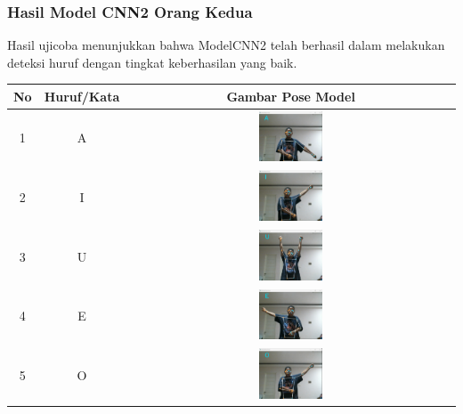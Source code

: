\subsubsection*{Hasil Model CNN2 Orang Kedua}

Hasil ujicoba menunjukkan bahwa ModelCNN2 telah berhasil dalam melakukan deteksi huruf dengan tingkat keberhasilan yang baik.

\begin{table}[!hbt]
	\centering
	\label{tbl:Tabel Contoh Huruf/Kata dan Gambar Pose Model CNN2 Orang Kedua}
	\begin{tabular}{|c|c|c|}
	\hline
	No & Huruf/Kata & Gambar Pose Model  \\
	\hline
	1 & A & \includegraphics[width=0.2\textwidth]{gambar/bener/HurufA_ModelCNN2_Fachry.png} \\
	\hline
	2 & I & \includegraphics[width=0.2\textwidth]{gambar/bener/HurufI_ModelCNN2_Fachry.png} \\
	\hline
	3 & U & \includegraphics[width=0.2\textwidth]{gambar/bener/HurufU_ModelCNN2_Fachry.png} \\
	\hline
	4 & E & \includegraphics[width=0.2\textwidth]{gambar/bener/HurufE_ModelCNN2_Fachry.png} \\
	\hline
	5 & O & \includegraphics[width=0.2\textwidth]{gambar/bener/HurufO_ModelCNN2_Fachry.png} \\

\end{tabular}
\end{table}
